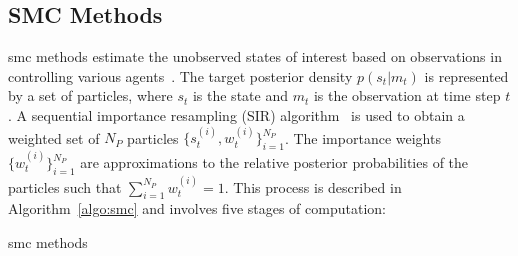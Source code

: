 \subsection{SMC Methods}
\label{sec:smc}

\gls{smc} methods estimate the unobserved states of interest based on observations in controlling various agents~\cite{doucet01}.
The target posterior density $p(s_t|m_t)$ is represented by a set of particles, where $s_t$ is the state and $m_t$ is the observation at time step $t$.
A sequential importance resampling (SIR) algorithm~\cite{gordon93} is used to obtain a weighted set of $N_P$ particles $\{s_t^{(i)},w_t^{(i)}\}^{N_P}_{i=1}$.
The importance weights $\{w_t^{(i)}\}^{N_P}_{i=1}$ are approximations to the relative posterior probabilities of the particles such that $\sum^{N_P}_{i=1}w^{(i)}_t = 1$.
This process is described in Algorithm~\ref{algo:smc} and involves five stages of computation:

\begin{algorithm}
\caption{\gls{smc} methods}
\footnotesize
\begin{algorithmic}[1]
			 \label{algo:s}
			 \label{algo:i}
		\ENDWHILE
	\ENDFOR
	\ENDIF
\ENDWHILE
{}
\ENDFOR
\end{algorithmic}
\label{algo:smc}
\end{algorithm}

